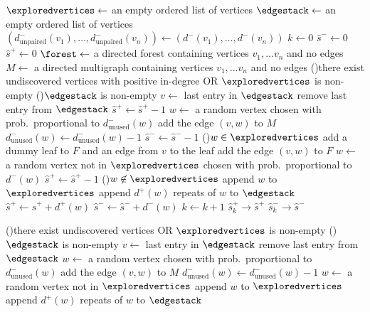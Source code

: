 \begin{algorithm}[htbp]
    \SetAlgoLined
    $\exploredvertices \leftarrow$ an empty ordered list of vertices \;
    $\edgestack \leftarrow$ an empty ordered list of vertices \;
    $(d^-_{\mathrm{unpaired}}(v_1),\dots,d^-_{\mathrm{unpaired}}(v_n))\leftarrow (d^-(v_1),\dots,d^-(v_n))$  \;
    $k \leftarrow 0$  \;
    $\hat{s}^- \leftarrow 0$ \;
    $\hat{s}^+ \leftarrow 0$  \;
    $\forest \leftarrow$ a directed forest containing vertices $v_1,\dots v_n$ and no edges
    \;
     $M \leftarrow$ a directed multigraph containing vertices $v_1,\dots v_n$ and no edges
    \;
    \While(){there exist undiscovered vertices with positive in-degree OR $\exploredvertices$ is non-empty}{
        \eIf(){$\edgestack$ is non-empty}{
            $v \leftarrow$ last entry in $\edgestack$ \;
            remove last entry from $\edgestack$ \;
            $\hat{s}^+\leftarrow \hat{s}^+-1$\;
            $w \leftarrow$ a random vertex chosen with prob.\ proportional to $d^-_{\mathrm{unused}}(w)$\;
            add the edge $(v,w)$ to $M$\;
            $d^-_{\mathrm{unused}}(w)\leftarrow d^-_{\mathrm{unused}}(w)-1$\;
            $\hat{s}^-\leftarrow \hat{s}^--1$\;
            \eIf(){$w\in \exploredvertices$}{
            add a dummy leaf to $F$ and an edge from $v$ to the leaf\;}{
            add the edge $(v,w)$ to $F$\;
            }
        }{
        $w\leftarrow$ a random vertex not in $\exploredvertices$ chosen with prob.\ proportional to $d^-(w)$ \;
        $\hat{s}^+\leftarrow \hat{s}^+-1$\;}
        \If(){$w\not\in \exploredvertices$}{
        append $w$ to $\exploredvertices$\;
        append $d^+(w)$ repeats of $w$ to $\edgestack$\;
        $\hat{s}^+\leftarrow \hat{s}^++d^+(w)$
        $\hat{s}^-\leftarrow \hat{s}^-+d^-(w)$
        }
        $k\leftarrow k+1$\;
        $\hat{s}^+_k\to \hat{s}^+$\;
        $\hat{s}^-_k\to \hat{s}^-$\;
        }
        
    \While(){there exist undiscovered vertices OR $\exploredvertices$ is non-empty}{
        \eIf(){$\edgestack$ is non-empty}{
            $v \leftarrow$ last entry in $\edgestack$ \;
            remove last entry from $\edgestack$ \;
            $w \leftarrow$ a random vertex chosen with prob.\ proportional to $d^-_{\mathrm{unused}}(w)$\;
            add the edge $(v,w)$ to $M$\;
            $d^-_{\mathrm{unused}}(w)\leftarrow d^-_{\mathrm{unused}}(w)-1$\;
            }{
            $w\leftarrow$ a random vertex not in $\exploredvertices$\;
            append $w$ to $\exploredvertices$\;
            append $d^+(w)$ repeats of $w$ to $\edgestack$\;
        }
        }
    

\end{algorithm}
